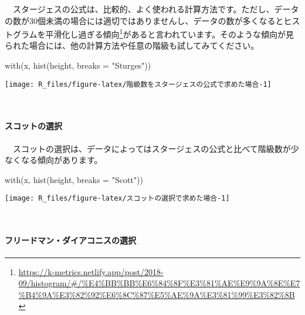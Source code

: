 \documentclass[
  12pt,
]{book}
\newenvironment{Shaded}{\begin{snugshade}}{\end{snugshade}}
\newcommand{\AttributeTok}[1]{\textcolor[rgb]{0.77,0.63,0.00}{#1}}
\newcommand{\FunctionTok}[1]{\textcolor[rgb]{0.00,0.00,0.00}{#1}}
\newcommand{\NormalTok}[1]{#1}
\newcommand{\StringTok}[1]{\textcolor[rgb]{0.31,0.60,0.02}{#1}}
\DeclareRobustCommand{\href}[2]{#2\footnote{\url{#1}}}
\begin{document}
　スタージェスの公式は、比較的、よく使われる計算方法です。ただし、データの数が\(30\)個未満の場合には適切ではありませんし、データの数が多くなるとヒストグラムを\href{https://k-metrics.netlify.app/post/2018-09/histogram/\#/\%E4\%BB\%BB\%E6\%84\%8F\%E3\%81\%AE\%E9\%9A\%8E\%E7\%B4\%9A\%E3\%82\%92\%E6\%8C\%87\%E5\%AE\%9A\%E3\%81\%99\%E3\%82\%8B}{平滑化し過ぎる傾向}があると言われています。そのような傾向が見られた場合には、他の計算方法や任意の階級も試してみてください。

\begin{Shaded}
\begin{Highlighting}[]
\FunctionTok{with}\NormalTok{(x, }\FunctionTok{hist}\NormalTok{(height, }\AttributeTok{breaks =} \StringTok{"Sturges"}\NormalTok{))}
\end{Highlighting}
\end{Shaded}

\begin{center}\texttt{[image: R\_files/figure-latex/階級数をスタージェスの公式で求めた場合-1]} \end{center}

　

\hypertarget{ux30b9ux30b3ux30c3ux30c8ux306eux9078ux629e}{%
\paragraph*{スコットの選択}\label{ux30b9ux30b3ux30c3ux30c8ux306eux9078ux629e}}

　スコットの選択は、データによってはスタージェスの公式と比べて階級数が少なくなる傾向があります。

\begin{Shaded}
\begin{Highlighting}[]
\FunctionTok{with}\NormalTok{(x, }\FunctionTok{hist}\NormalTok{(height, }\AttributeTok{breaks =} \StringTok{"Scott"}\NormalTok{))}
\end{Highlighting}
\end{Shaded}

\begin{center}\texttt{[image: R\_files/figure-latex/スコットの選択で求めた場合-1]} \end{center}

　

\hypertarget{ux30d5ux30eaux30fcux30c9ux30deux30f3ux30c0ux30a4ux30a2ux30b3ux30cbux30b9ux306eux9078ux629e}{%
\paragraph*{フリードマン・ダイアコニスの選択}\label{ux30d5ux30eaux30fcux30c9ux30deux30f3ux30c0ux30a4ux30a2ux30b3ux30cbux30b9ux306eux9078ux629e}}
\end{document}
